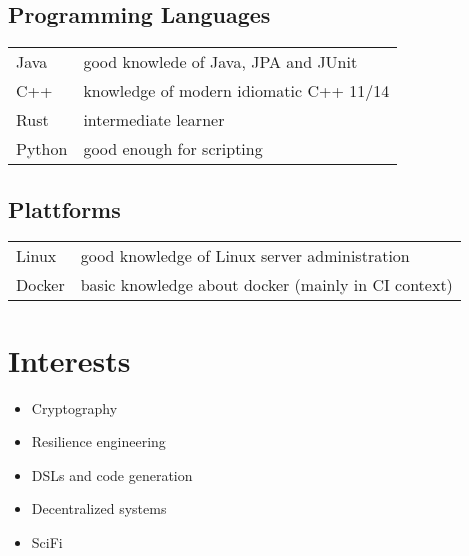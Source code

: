 \documentclass{gnet_cv}
\begin{document}
\subsection{Programming Languages}
\begin{tabularx}{\textwidth}{L{mylhead} l}
    Java & good knowlede of Java, JPA and JUnit\\
    C++ & knowledge of modern idiomatic C++ 11/14\\
    Rust & intermediate learner\\
    Python & good enough for scripting\\
    
\end{tabularx}
%
\subsection{Plattforms}
\begin{tabularx}{\textwidth}{L{mylhead} l}
    Linux & good knowledge of Linux server administration\\
    Docker & basic knowledge about docker (mainly in CI context)\\
    
\end{tabularx}
%
\section{Interests}
\begin{minipage}[t]{0.45\textwidth}
\begin{itemize}
    \setlength\itemsep{0pt}
    \item Cryptography
    \item Resilience engineering
    \item DSLs and code generation
\end{itemize}
\end{minipage}
\begin{minipage}[t]{0.45\textwidth}
\begin{itemize}
    \setlength\itemsep{0pt}
    \item Decentralized systems
    \item SciFi
\end{itemize}
\end{minipage}
\end{document}
